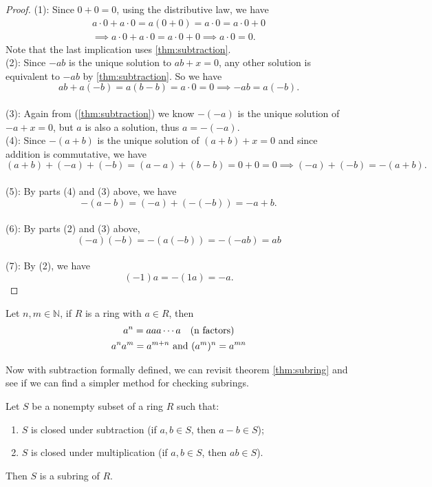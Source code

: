 \documentclass[../main.tex]{subfiles}
\begin{document}
\begin{proof}
(1): Since $0 + 0 = 0$, using the distributive law, we have
\begin{gather*}
a \cdot 0 + a \cdot 0 = a(0 + 0) = a \cdot 0 = a \cdot 0 + 0 \\
\implies a \cdot 0 + a \cdot 0 = a \cdot 0 + 0 \implies a \cdot 0 = 0.
\end{gather*}
Note that the last implication uses \ref{thm:subtraction}. \\

(2): Since $-ab$ is the unique solution to $ab + x = 0$, any other solution
is equivalent to $-ab$ by \ref{thm:subtraction}. So we have\[
ab + a(-b) = a(b - b) = a\cdot 0 = 0 \implies -ab = a(-b).
\]\\
(3): Again from (\ref{thm:subtraction}) we know \(-(-a)\) is the unique solution
of \(-a + x = 0\), but \(a\) is also a solution, thus \(a = -(-a)\). \\
(4): Since \(-(a+b)\) is the unique solution of \((a+b) + x = 0\) and since addition
is commutative, we have \[
(a+b) + (-a) + (-b) = (a-a) + (b-b) = 0 + 0 = 0 \implies (-a) + (-b) = -(a+b).
\]\\
(5): By parts (4) and (3) above, we have \[
-(a-b) = (-a) + (-(-b)) = -a + b.
\]\\
(6): By parts (2) and (3) above, \[
(-a)(-b) = -(a(-b)) = -(-ab) = ab
\]\\
(7): By (2), we have \[
(-1)a = -(1a) = -a.
\]
\end{proof}



\begin{exercise}\label{ex:def of exponential}
Let $n,m \in \mathbb{N}$, if \(R\) is a ring with $a\in R$, then
\begin{gather*}
    a^n = aaa\cdots a \quad (\textnormal{n factors})\\
    a^na^m = a^{m+n} \textnormal{ and } (a^m)^n = a^{mn}
\end{gather*}


\end{exercise}




\begin{remark}
    Now with subtraction formally defined, we can revisit theorem \ref{thm:subring}
    and see if we can find a simpler method for checking subrings.
\end{remark}


\begin{proposition}[Subring]\label{thm:check for subring_p2}
Let $S$ be a nonempty subset of a ring $R$ such that:
\begin{enumerate}
    \item $S$ is closed under subtraction (if $a, b \in S$, then $a - b \in S$);
    \item $S$ is closed under multiplication (if $a, b \in S$, then $ab \in S$).
\end{enumerate}
Then $S$ is a subring of $R$.
\end{proposition}
\end{document}
